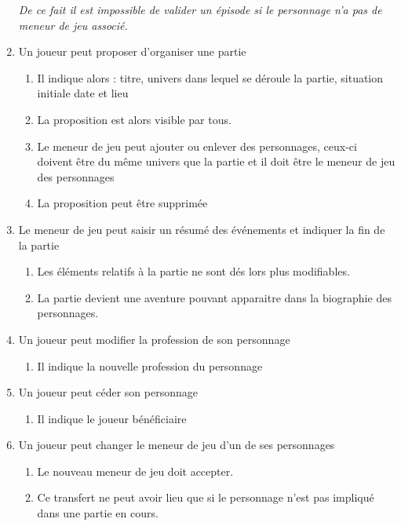 \documentclass[a4paper, 11pt, titlepage]{article}
\begin{document}
\begin{enumerate}
      \textit{De ce fait il est impossible de valider un épisode si le personnage n'a pas de meneur de jeu associé.}
    \item Un joueur peut proposer d'organiser une partie
    \begin{enumerate}
        \item  Il indique alors : titre, univers dans lequel se déroule la partie, situation initiale date et lieu
        \item La proposition est alors visible par tous.
        \item Le meneur de jeu peut ajouter ou enlever des personnages, ceux-ci doivent être du même univers que la partie et il doit être le meneur de jeu des personnages
        \item La proposition peut être supprimée
    \end{enumerate}
    \item Le meneur de jeu peut saisir un résumé des événements et indiquer la fin de la partie
    \begin{enumerate}
        \item Les éléments relatifs à la partie ne sont dés lors plus modifiables.
        \item La partie devient une aventure pouvant apparaitre dans la biographie des personnages.

    \end{enumerate}
    \item Un joueur peut modifier la profession de son personnage
    \begin{enumerate}
        \item Il indique la nouvelle profession du personnage
    \end{enumerate}
    \item Un joueur peut céder son personnage
    \begin{enumerate}
        \item Il indique le joueur bénéficiaire
    \end{enumerate}
    \item Un joueur peut changer le meneur de jeu d'un de ses personnages
    \begin{enumerate}
        \item Le nouveau meneur de jeu doit accepter.
        \item Ce transfert ne peut avoir lieu que si le personnage n'est pas impliqué dans une partie en cours.
    \end{enumerate}
    \end{enumerate}
\end{document}
